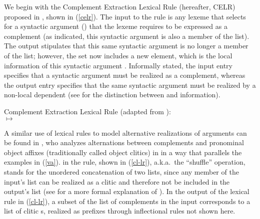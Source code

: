 \documentclass[output=paper,biblatex,babelshorthands,newtxmath,draftmode,colorlinks,citecolor=brown]{langscibook}
\begin{document}
\largerpage
We begin with the Complement Extraction Lexical Rule (hereafter, CELR) proposed in , shown in (\ref{celr}). The input to the rule is any lexeme that selects for
a syntactic argument () that the lexeme requires to be expressed as a complement (as
indicated, this syntactic argument is also a member of the  list). The output
stipulates that this same syntactic argument is no longer a member of the  list;
however, the  set now includes a new element, which is the local information of this
syntactic argument . Informally stated, the input entry specifies that a syntactic argument
must be realized as a complement, whereas the output entry specifies that the same syntactic
argument must be realized by a non-local dependent (see \citealt[Chapter~4]{PollardandSag1994} for
the distinction between  and  information).

\ea
Complement Extraction Lexical Rule (adapted from \citealt[]{PollardandSag1994}):\\
\label{celr}
	$\mapsto$
\z

\noindent
A similar use of lexical rules to model alternative realizations of arguments can be found in
, who analyzes alternations between
complements and pronominal object affixes (traditionally called object clitics) in  in
a way that parallels the  examples in (\ref{va}). \shuffle\is{$\bigcirc$} in the rule,
shown in (\ref{cl-lr}), a.k.a.\ the ``shuffle'' operation, stands for the unordered
concatenation of two lists, since any member of the input's  list can be realized as a
clitic and therefore not be included in the output's  list (see
\crossrefchaptert[\pageref{rel-shuffle}]{order} for a more formal explanation of \shuffle). In the
output of the lexical rule in (\ref{cl-lr}), a subset of the list of complements in the input
 corresponds to a list of clitic s, realized as prefixes through inflectional
rules not shown here.
\end{document}
